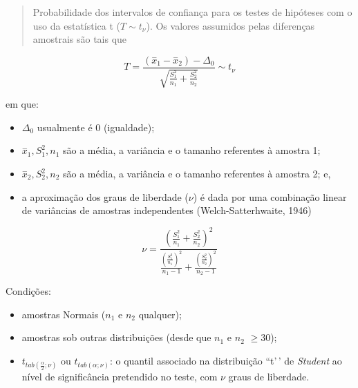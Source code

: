 \documentclass[
]{book}
\providecommand{\tightlist}{%
  \setlength{\itemsep}{0pt}\setlength{\parskip}{0pt}}
\begin{document}
\begin{quote}
Probabilidade dos intervalos de confiança para os testes de hipóteses com o uso da estatística t (\(T \sim t_{\nu}\)). Os valores assumidos pelas diferenças amostrais são tais que
\end{quote}

\hfill\break

\[
T =  \frac{(\stackrel{-}{x}_{1} - \stackrel{-}{x}_{2})-\Delta_{0}}{  \sqrt{\frac{S_{1}^{2}}{n_{1}}+\frac{S_{2}^{2}}{n_{2}}}}  \sim t_{\nu}
\]

\hfill\break

em que:

\hfill\break

\begin{itemize}
\tightlist
\item
  \(\Delta_{0}\) usualmente é 0 (igualdade);\\
\item
  \(\stackrel{-}{x}_{1}, S_{1}^{2}, n_{1}\) são a média, a variância e o tamanho referentes à amostra 1;\\
\item
  \(\stackrel{-}{x}_{2}, S_{2}^{2}, n_{2}\) são a média, a variância e o tamanho referentes à amostra 2; e,\\
\item
  a aproximação dos graus de liberdade (\(\nu\)) é dada por uma combinação linear de variâncias de amostras independentes (Welch-Satterhwaite, 1946)
\end{itemize}

\hfill\break

\[
\nu=\frac{{\left(\frac{{S}_{1}^{2}}{{n}_{1}}+\frac{{S}_{2}^{2}}{{n}_{2}}\right)}^{2}}{\frac{{\left(\frac{{S}_{1}^{2}}{{n}_{1}}\right)}^{2}}{{n}_{1}-1}+\frac{{\left(\frac{{S}_{2}^{2}}{{n}_{2}}\right)}^{2}}{{n}_{2}-1}}
\]

\hfill\break

Condições:

\hfill\break

\begin{itemize}
\tightlist
\item
  amostras Normais (\(n_{1}\) e \(n_{2}\) qualquer);\\
\item
  amostras sob outras distribuições (desde que \(n_{1}\) e \(n_{2}\) \(\ge 30\));\\
\item
  \({t}_{tab\left(\frac{\alpha }{2};\nu\right)}\) ou \({t}_{tab\left(\alpha ;\nu\right)}\): o quantil associado na distribuição ``t'\,' de \emph{Student} ao nível de significância pretendido no teste, com \(\nu\) graus de liberdade.
\end{itemize}
\end{document}
